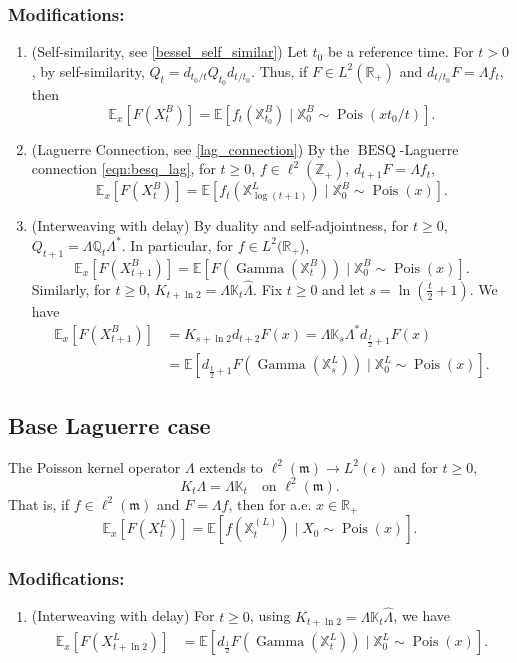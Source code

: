 \documentclass[11pt,a4,reqno]{amsart}
\numberwithin{equation}{section}
\theoremstyle{definition}
\theoremstyle{remark}
\newcommand{\bb}[1]{\mathbb{#1}}
\newcommand{\frk}[1]{\mathfrak{#1}}
\newcommand{\E}{\bb{E}}
\newcommand{\R}{\bb{R}}
\newcommand{\Z}{\bb{Z}}
\DeclareMathOperator{\besq}{BESQ}
\DeclareMathOperator{\pois}{Pois}
\DeclareMathOperator{\Gam}{Gamma}
\newcommand{\beq}{\begin{equation}}
\newcommand{\eeq}{\end{equation}}
\begin{document}
\subsubsection{Modifications:}
	\begin{enumerate}
	
		\item (Self-similarity, see \ref{bessel_self_similar}) Let $t_0$ be a reference time. For $t > 0$, by self-similarity, $Q_t = d_{t_0/t} Q_{t_0} d_{t/t_0}$. Thus, if $F \in L^2(\R_+)$ and $d_{t/t_0} F = \Lambda f_t$, then
			\beq \E_x[F(X_t^B)] = \E[f_t(\bb{X}^B_{t_0}) \mid \bb{X}^B_0 \sim \pois(xt_0/t)] . \eeq
			
		\item (Laguerre Connection, see \ref{lag_connection}) By the $\besq$-Laguerre connection \eqref{eqn:besq_lag}, for $t \geq  0$, $f \in \ell^2(\Z_+)$, $d_{t + 1}F = \Lambda f_t$,
			\beq \E_x[F(X_t^{B})] = \E[f_t(\bb{X}^{L}_{\log (t + 1)}) \mid \bb{X}^B_0 \sim \pois(x)] . \eeq
			
		\item (Interweaving with delay) By duality and self-adjointness, for $t \geq 0$,  $Q_{t + 1} = \Lambda \bb{Q}_t \Lambda^*$. In particular, for $f \in L^2(\R_+$), 
			\beq \E_x[F(X_{t + 1}^{B})] = \E[F(\Gam(\bb{X}_t^{B})) \mid \bb{X}^B_0 \sim \pois(x)] . \eeq
			Similarly, for $t \geq 0$, $K_{t + \ln 2} = \Lambda \bb{K}_t \widehat{\Lambda}$. Fix $t \geq 0$ and let $s = \ln (\frac{t}{2} + 1)$. We have
			\begin{align}
			 \E_x[F(X_{t + 1}^{B})] &= K_{s + \ln 2} d_{t+2} F (x) = \Lambda \bb{K}_s \Lambda^* d_{\frac{t}{2} + 1} F(x) \\
			 &= \E[d_{\frac{t}{2} + 1} F(\Gam(\bb{X}_s^{L})) \mid \bb{X}^L_0 \sim \pois(x)].
			\end{align}
	
	\end{enumerate}
	
\subsection{Base Laguerre case} 
	The Poisson kernel operator $\Lambda$ extends to $\ell^2(\frk{m}) \to L^2(\epsilon)$ and for $t \geq 0$, 
	\beq K_t\Lambda = \Lambda \bb{K}_t \quad \text{on } \ell^2(\frk{m}). \eeq
	That is, if $f \in \ell^2(\frk{m})$ and $F = \Lambda f$, then for a.e. $x \in \R_+$
	\beq \E_x[F(X_t^{L})] = \E[f(\bb{X}_t^{(L)}) \mid X_0 \sim \pois(x)] . \eeq

\subsubsection{Modifications:}
	\begin{enumerate}
	\item (Interweaving with delay) For $t \geq 0$, using $K_{t + \ln 2} = \Lambda \bb{K}_t \widehat{\Lambda}$, we have
			\begin{align}
			 \E_x[F(X_{t + \ln 2}^{L})] &= \E[d_{\frac{1}{2}} F(\Gam(\bb{X}_t^{L})) \mid \bb{X}^L_0 \sim \pois(x)].
			\end{align}
	
	\end{enumerate}
	
\end{document}
